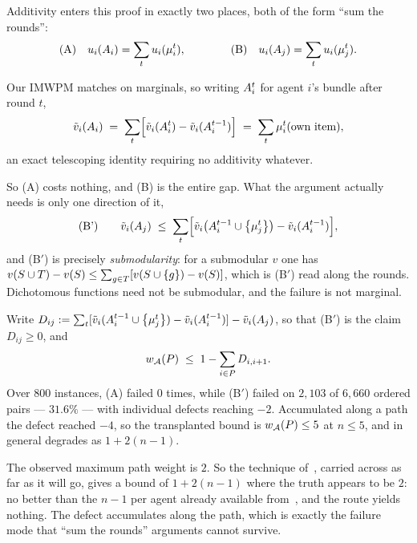 Additivity enters this proof in exactly two places, both of the form ``sum the
rounds'':
\[
  \textrm{(A)}\quad u_i(A_{i}) = \sum_t u_i(\mu_i^t),
  \qquad\qquad
  \textrm{(B)}\quad u_i(A_{j}) = \sum_t u_i(\mu_j^t).
\]

\begin{lemma}
\label{lem:own-telescoping}
Our IMWPM matches on marginals, so writing $A_{i}^t$ for agent $i$'s bundle
after round $t$,
\[
  \tilde v_i(A_{i})
  \;=\; \sum_t \Bigl[\tilde v_i(A_{i}^{t}) - \tilde v_i(A_{i}^{t-1})\Bigr]
  \;=\; \sum_t \mu_i^t(\text{own item}),
\]
an exact telescoping identity requiring no additivity whatever.
\end{lemma}

So (A) costs nothing, and (B) is the entire gap. What the argument actually needs
is only one direction of it,
\[
  \textrm{(B')}\qquad
  \tilde v_i(A_{j}) \;\le\;
  \sum_t \Bigl[\tilde v_i\bigl(A_{i}^{t-1} \cup \left\{\mu_j^t\right\}\bigr)
               - \tilde v_i(A_{i}^{t-1})\Bigr],
\]
and (B$'$) is precisely \emph{submodularity}: for a submodular $v$ one has
$v(S \cup T) - v(S) \le \sum_{g \in T}[v(S \cup \left\{g\right\}) - v(S)]$, which is (B$'$)
read along the rounds. Dichotomous functions need not be submodular, and the
failure is not marginal.

\begin{proposition}
\label{prop:r11-defect}
Write $D_{ij} := \sum_t [\tilde v_i(A_{i}^{t-1} \cup \left\{\mu_j^t\right\}) -
\tilde v_i(A_{i}^{t-1})] - \tilde v_i(A_{j})$, so that (B$'$) is the
claim $D_{ij} \ge 0$, and
\[
  w_{\mathcal{A}}(P) \;\le\; 1 - \sum_{i \in P} D_{i,i+1}.
\]
Over $800$ instances, (A) failed $0$ times, while (B$'$) failed on $2{,}103$ of
$6{,}660$ ordered pairs --- $31.6\%$ --- with individual defects reaching $-2$.
Accumulated along a path the defect reached $-4$, so the transplanted bound is
$w_{\mathcal{A}}(P) \le 5$ at $n \le 5$, and in general degrades as $1 + 2(n-1)$.
\end{proposition}

The observed maximum path weight is $2$. So the technique of~\cite{LMS26}, carried
across as far as it will go, gives a bound of $1 + 2(n-1)$ where the truth appears
to be $2$: no better than the $n-1$ per agent already available
from~\cite{KMSTY24}, and the route yields nothing. The defect accumulates along
the path, which is exactly the failure mode that ``sum the rounds'' arguments
cannot survive.

